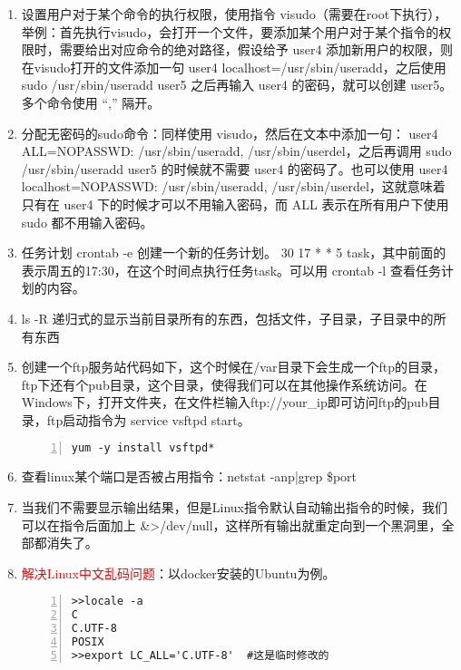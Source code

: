 \begin{enumerate}
  \item 设置用户对于某个命令的执行权限，使用指令 visudo（需要在root下执行），举例：首先执行visudo，会打开一个文件，要添加某个用户对于某个指令的权限时，需要给出对应命令的绝对路径，假设给予 user4 添加新用户的权限，则在visudo打开的文件添加一句 user4 localhost=/usr/sbin/useradd，之后使用 sudo /usr/sbin/useradd user5 之后再输入 user4 的密码，就可以创建 user5。多个命令使用 “,” 隔开。
  \item 分配无密码的sudo命令：同样使用 visudo，然后在文本中添加一句： user4 ALL=NOPASSWD: /usr/sbin/useradd, /usr/sbin/userdel，之后再调用 sudo /usr/sbin/useradd user5 的时候就不需要 user4 的密码了。也可以使用 user4 localhost=NOPASSWD: /usr/sbin/useradd, /usr/sbin/userdel，这就意味着只有在 user4 下的时候才可以不用输入密码，而 ALL 表示在所有用户下使用 sudo 都不用输入密码。
  \item 任务计划  crontab -e 创建一个新的任务计划。 30 17 * * 5 task，其中前面的表示周五的17:30，在这个时间点执行任务task。可以用 crontab -l 查看任务计划的内容。
  \item ls -R 递归式的显示当前目录所有的东西，包括文件，子目录，子目录中的所有东西
  \item 创建一个ftp服务站代码如下，这个时候在/var目录下会生成一个ftp的目录，ftp下还有个pub目录，这个目录，使得我们可以在其他操作系统访问。在Windows下，打开文件夹，在文件栏输入ftp://your\_ip即可访问ftp的pub目录，ftp启动指令为 service vsftpd start。
  \begin{lstlisting}[language = shell, numbers=left, 
         numberstyle=\tiny,keywordstyle=\color{blue!70},
         commentstyle=\color{red!50!green!50!blue!50},frame=shadowbox,
         rulesepcolor=\color{red!20!green!20!blue!20},basicstyle=\ttfamily]
yum -y install vsftpd*
  \end{lstlisting}
  \item 查看linux某个端口是否被占用指令：netstat -anp|grep \$port
  \item 当我们不需要显示输出结果，但是Linux指令默认自动输出指令的时候，我们可以在指令后面加上 \&>/dev/null，这样所有输出就重定向到一个黑洞里，全部都消失了。
  \item \textcolor{red}{解决Linux中文乱码问题}：以docker安装的Ubuntu为例。
   \begin{lstlisting}[language = shell, numbers=left, 
         numberstyle=\tiny,keywordstyle=\color{blue!70},
         commentstyle=\color{red!50!green!50!blue!50},frame=shadowbox,
         rulesepcolor=\color{red!20!green!20!blue!20},basicstyle=\ttfamily]
>>locale -a
C
C.UTF-8
POSIX
>>export LC_ALL='C.UTF-8'  #这是临时修改的

\end{lstlisting}
\end{enumerate}
